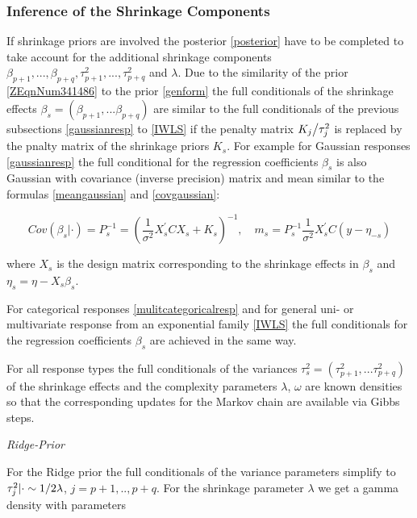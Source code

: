 \documentclass[11pt,a4paper,twoside]{bayesxarticle}
\begin{document}
\subsubsection{Inference of the Shrinkage Components}
\label{Inference_Shrinkage}

If shrinkage priors are involved the posterior \eqref{posterior} have 
to be completed to take account for the additional shrinkage components $\beta _{p+1} 
,...,\beta _{p+q} ,\tau _{p+1}^{2} ,...,\tau _{p+q}^{2} $ and $\lambda $. Due to 
the similarity of the prior \eqref{ZEqnNum341486} to the prior \eqref{genform} 
the full conditionals of the shrinkage effects $\beta _{s} =\left(\beta _{p+1} ,...
\beta _{p+q} \right)$ are similar to the full conditionals of the previous subsections 
\ref{gaussianresp} to \ref{IWLS} if the penalty matrix ${K_{j} \mathord{\left/ {\vphantom {K_{j}  \tau 
_{j}^{2} }} \right. \kern-\nulldelimiterspace} \tau _{j}^{2} } $ is replaced by the 
pnalty matrix of the shrinkage priors $K_{s} $. For example for Gaussian responses 
\ref{gaussianresp} the full conditional for the regression coefficients $\beta _{s} $ is 
also Gaussian with covariance (inverse precision) matrix and mean similar to the 
formulas \eqref{meangaussian} and \eqref{covgaussian}:

\[Cov\left(\beta _{s} |\cdot \right)=P_{s}^{-1} =\left(\frac{1}{\sigma ^{2} } X_{s} 
^{{'} } CX_{s} +K_{s} \right)^{-1} ,\quad m_{s} =P_{s}^{-1} \frac{1}{\sigma ^{2} 
} X_{s} ^{{'} } C\left(y-\eta _{-s} \right)\] 

where $X_{s} $ is the design matrix corresponding to the shrinkage effects in $\beta _{s} $ and $\eta 
_{s} =\eta -X_{s} \beta _{s} $. 

For categorical responses \ref{mulitcategoricalresp} and for general uni- or multivariate 
response from an exponential family \ref{IWLS} the full conditionals for the 
regression coefficients $\beta _{s} $ are achieved in the same way.

For all response types the full conditionals of the variances $\tau _{s}^{2} 
=\left(\tau _{p+1}^{2} ,...\tau _{p+q}^{2} \right)$ of the shrinkage effects and 
the complexity parameters $\lambda$, $\omega $ are known densities so that the corresponding 
updates for the Markov chain are available via Gibbs steps.

{\em Ridge-Prior}

For the Ridge prior the full conditionals of the variance parameters simplify 
to $\tau _{j}^{2} |\cdot \sim {1\mathord{\left/ {\vphantom {1 2\lambda }} \right. 
\kern-\nulldelimiterspace} 2\lambda } $, $j=p+1,..,p+q$. For the shrinkage parameter $\lambda $ we 
get a gamma density with parameters
\end{document}
